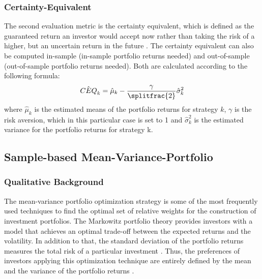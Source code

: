 \documentclass{article}
\begin{document}
\subsubsection{Certainty-Equivalent}
The second evaluation metric is the certainty equivalent, which is defined as the guaranteed return an investor would accept now rather than taking the risk of a higher, but an uncertain return in the future \cite{CTA}. The certainty equivalent can also be computed in-sample (in-sample portfolio returns needed) and out-of-sample (out-of-sample portfolio returns needed). Both are calculated according to the following formula:
\begin{align}
\hat{CEQ}_{k} = \hat{\mu}_{k} - \frac{\gamma}{\splitfrac{2}}\hat{\sigma}_{k}^{2}
\end{align} 
where $\hat{\mu}_{k}$ is the estimated means of the portfolio returns for strategy $k$, $\gamma$ is the risk aversion, which in this particular case is set to 1 and $\hat{\sigma}_{k}^{2}$ is the estimated variance for the portfolio returns for strategy {k}. 
\subsection{Sample-based Mean-Variance-Portfolio}
\subsubsection{Qualitative Background}
The mean-variance portfolio optimization strategy is some of the most frequently used techniques to find the optimal set of relative weights for the construction of investment portfolios. The Markowitz portfolio theory provides investors with a model that achieves an optimal trade-off between the expected returns and the volatility. In addition to that, the standard deviation of the portfolio returns measures the total risk of a particular investment . Thus, the preferences of investors applying this optimization technique are entirely defined by the mean and the variance of the portfolio returns \cite{RAM07}.
\end{document}
